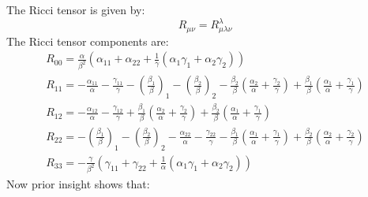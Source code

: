 \documentclass{article}
\begin{document}
The Ricci tensor is given by:
\begin{equation}
R_{\mu\nu}=R_{\mu\lambda\nu}^{\lambda}
\end{equation}
The Ricci tensor components are:
\begin{equation}
\begin{array}{l}
R_{00}=\frac{\alpha}{\beta^{2}}\left(\alpha_{11}+\alpha_{22}+\frac{1}{\gamma}\left(\alpha_{1}\gamma_{1}+\alpha_{2}\gamma_{2}\right)\right)\\
R_{11}=-\frac{\alpha_{11}}{\alpha}-\frac{\gamma_{11}}{\gamma}-\left(\frac{\beta_{1}}{\beta}\right)_{1}-\left(\frac{\beta_{2}}{\beta}\right)_{2}-\frac{\beta_{2}}{\beta}\left(\frac{\alpha_{2}}{\alpha}+\frac{\gamma_{2}}{\gamma}\right)+\frac{\beta_{1}}{\beta}\left(\frac{\alpha_{1}}{\alpha}+\frac{\gamma_{1}}{\gamma}\right)\\
R_{12}=-\frac{\alpha_{12}}{\alpha}-\frac{\gamma_{12}}{\gamma}+\frac{\beta_{1}}{\beta}\left(\frac{\alpha_{2}}{\alpha}+\frac{\gamma_{2}}{\gamma}\right)+\frac{\beta_{2}}{\beta}\left(\frac{\alpha_{1}}{\alpha}+\frac{\gamma_{1}}{\gamma}\right)\\
R_{22}=-\left(\frac{\beta_{1}}{\beta}\right)_{1}-\left(\frac{\beta_{2}}{\beta}\right)_{2}-\frac{\alpha_{22}}{\alpha}-\frac{\gamma_{22}}{\gamma}-\frac{\beta_{1}}{\beta}\left(\frac{\alpha_{1}}{\alpha}+\frac{\gamma_{1}}{\gamma}\right)+\frac{\beta_{2}}{\beta}\left(\frac{\alpha_{2}}{\alpha}+\frac{\gamma_{2}}{\gamma}\right)\\
R_{33}=-\frac{\gamma}{\beta^{2}}\left(\gamma_{11}+\gamma_{22}+\frac{1}{\alpha}\left(\alpha_{1}\gamma_{1}+\alpha_{2}\gamma_{2}\right)\right)
\end{array}\label{eq:ricci-tensor-components}
\end{equation}
Now prior insight shows that:
\end{document}
